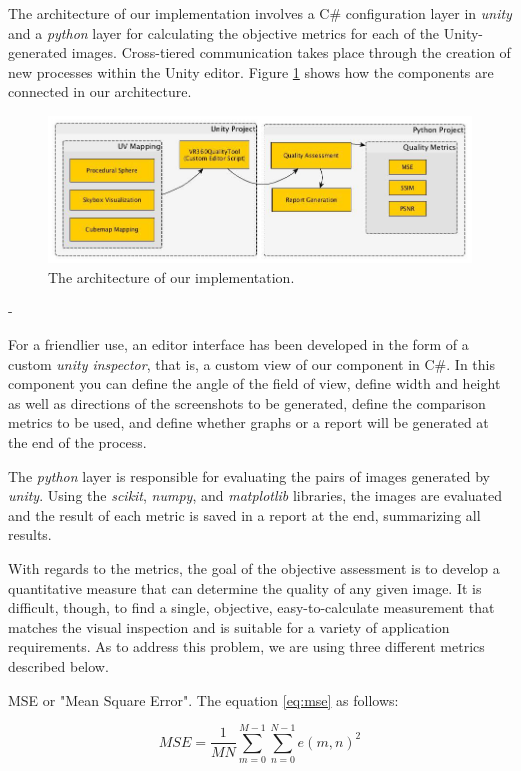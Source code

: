 \documentclass[12pt]{article}
\begin{document}
The architecture of our implementation involves a C\# configuration layer in \textit{unity} and a \textit{python} layer for calculating the objective metrics for each of the Unity-generated images. Cross-tiered communication takes place through the creation of new processes within the Unity editor. Figure \ref{fig:toolarch} shows how the components are connected in our architecture.

\begin{figure}[ht]
\centering
\includegraphics[width=\textwidth]{images/tool_arch_en.jpg}
\caption{The architecture of our implementation.}
\label{fig:toolarch}
\end{figure}-

For a friendlier use, an editor interface has been developed in the form of a custom \textit{unity inspector}, that is, a custom view of our component in C\#. In this component you can define the angle of the field of view, define width and height as well as directions of the screenshots to be generated, define the comparison metrics to be used, and define whether graphs or a report will be generated at the end of the process.

The \textit{python} layer is responsible for evaluating the pairs of images generated by \textit{unity}. Using the \textit{scikit}, \textit{numpy}, and \textit{matplotlib} libraries, the images are evaluated and the result of each metric is saved in a report at the end, summarizing all results. 

With regards to the metrics, the goal of the objective assessment is to develop a quantitative measure that can determine the quality of any given image. It is difficult, though, to find a single, objective, easy-to-calculate measurement that matches the visual inspection and is suitable for a variety of application requirements. As to address this problem, we are using three different metrics described below.

MSE or "Mean Square Error". The equation \ref{eq:mse} as follows:

\begin{equation}
MSE=\frac{1}{MN}\sum_{m=0}^{M-1}{\sum_{n=0}^{N-1}{e(m,n)^2}}
\label{eq:mse}
\end{equation}
\end{document}
